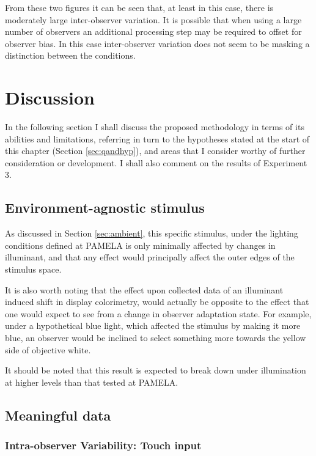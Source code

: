 From these two figures it can be seen that, at least in this case, there is moderately large inter-observer variation. It is possible that when using a large number of observers an additional processing step may be required to offset for observer bias. In this case inter-observer variation does not seem to be masking a distinction between the conditions.

\clearpage

\section{Discussion} \label{sec:tablet_Discussion}

In the following section I shall discuss the proposed methodology in terms of its abilities and limitations, referring in turn to the hypotheses stated at the start of this chapter (Section \ref{sec:qandhyp}), and areas that I consider worthy of further consideration or development. I shall also comment on the results of Experiment 3.

\subsection{Environment-agnostic stimulus}

As discussed in Section \ref{sec:ambient}, this specific stimulus, under the lighting conditions defined at \gls{PAMELA} is only minimally affected by changes in illuminant, and that any effect would principally affect the outer edges of the stimulus space.

It is also worth noting that the effect upon collected data of an illuminant induced shift in display colorimetry, would actually be opposite to the effect that one would expect to see from a change in observer adaptation state. For example, under a hypothetical blue light, which affected the stimulus by making it more blue, an observer would be inclined to select something more towards the yellow side of objective white. 

It should be noted that this result is expected to break down under illumination at higher levels than that tested at \gls{PAMELA}.

\subsection{Meaningful data}

\subsubsection{Intra-observer Variability: Touch input}

